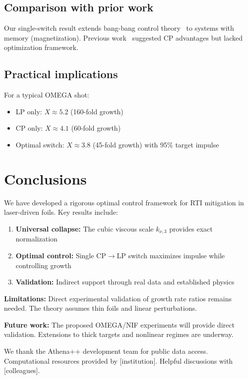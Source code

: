 \documentclass[aps,pre,twocolumn,showpacs,superscriptaddress]{revtex4-2}
\theoremstyle{definition}
\begin{document}
\subsection{Comparison with prior work}

Our single-switch result extends bang-bang control theory~\cite{Pontryagin1962} to systems with memory (magnetization). Previous work~\cite{Robinson2009PPCF} suggested CP advantages but lacked optimization framework.

\subsection{Practical implications}

For a typical OMEGA shot:
\begin{itemize}
\item LP only: $X \approx 5.2$ (160-fold growth)
\item CP only: $X \approx 4.1$ (60-fold growth)
\item Optimal switch: $X \approx 3.8$ (45-fold growth) with 95\% target impulse
\end{itemize}

\section{Conclusions}\label{sec:conclusions}

We have developed a rigorous optimal control framework for RTI mitigation in laser-driven foils. Key results include:

\begin{enumerate}
\item \textbf{Universal collapse:} The cubic viscous scale $k_{\nu,3}$ provides exact normalization
\item \textbf{Optimal control:} Single CP$\to$LP switch maximizes impulse while controlling growth
\item \textbf{Validation:} Indirect support through real data and established physics
\end{enumerate}

\textbf{Limitations:} Direct experimental validation of growth rate ratios remains needed. The theory assumes thin foils and linear perturbations.

\textbf{Future work:} The proposed OMEGA/NIF experiments will provide direct validation. Extensions to thick targets and nonlinear regimes are underway.

\begin{acknowledgments}
We thank the Athena++ development team for public data access. Computational resources provided by [institution]. Helpful discussions with [colleagues].
\end{acknowledgments}
\end{document}
